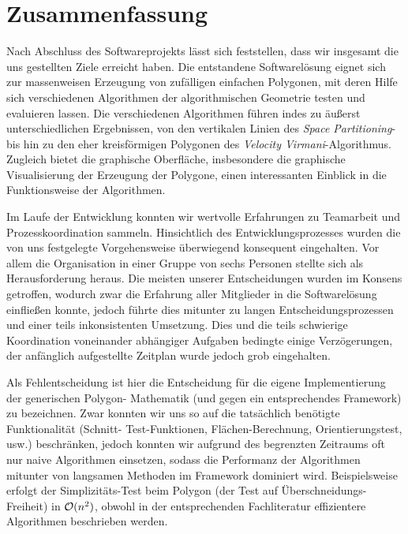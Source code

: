 \section{Zusammenfassung}

  Nach Abschluss des Softwareprojekts lässt sich feststellen, dass wir insgesamt 
  die uns gestellten Ziele erreicht haben.
  Die entstandene Softwarelösung eignet sich zur
  massenweisen Erzeugung von zufälligen einfachen Polygonen, mit deren Hilfe
  sich verschiedenen Algorithmen der algorithmischen Geometrie testen und
  evaluieren lassen. Die verschiedenen Algorithmen führen indes zu äußerst
  unterschiedlichen Ergebnissen, von den vertikalen Linien des \emph{Space
  Partitioning}- bis hin zu den eher kreisförmigen Polygonen des
  \emph{Velocity Virmani}-Algorithmus. Zugleich bietet die graphische
  Oberfläche, insbesondere die graphische Visualisierung der Erzeugung der
  Polygone, einen interessanten Einblick in die Funktionsweise der
  Algorithmen.

  Im Laufe der Entwicklung konnten wir wertvolle Erfahrungen zu Teamarbeit und
  Prozesskoordination sammeln. Hinsichtlich des Entwicklungsprozesses wurden die
  von uns festgelegte Vorgehensweise überwiegend konsequent eingehalten. Vor 
  allem
  die Organisation in einer Gruppe von sechs Personen stellte sich als
  Herausforderung heraus. Die meisten unserer Entscheidungen wurden im Konsens
  getroffen, wodurch zwar die Erfahrung aller Mitglieder in die Softwarelösung
  einfließen konnte, jedoch führte dies mitunter zu langen 
  Entscheidungsprozessen und
  einer teils inkonsistenten Umsetzung. Dies und die teils schwierige
  Koordination voneinander abhängiger Aufgaben bedingte einige Verzögerungen,
  der anfänglich aufgestellte Zeitplan wurde jedoch grob eingehalten.

  Als Fehlentscheidung ist hier die
  Entscheidung für die eigene Implementierung der generischen Polygon-
  Mathematik (und gegen ein entsprechendes Framework) zu bezeichnen. Zwar
  konnten wir uns so auf die tatsächlich benötigte Funktionalität (Schnitt-
  Test-Funktionen, Flächen-Berechnung, Orientierungstest, usw.) beschränken,
  jedoch konnten wir aufgrund des begrenzten Zeitraums oft nur naive
  Algorithmen einsetzen, sodass die Performanz der Algorithmen mitunter von
  langsamen Methoden im Framework dominiert wird. Beispielsweise erfolgt der
  Simplizitäts-Test beim Polygon (der Test auf Überschneidungs-Freiheit)
  in $\mathcal{O}(n^2)$, obwohl in der entsprechenden Fachliteratur effizientere
  Algorithmen beschrieben werden.


